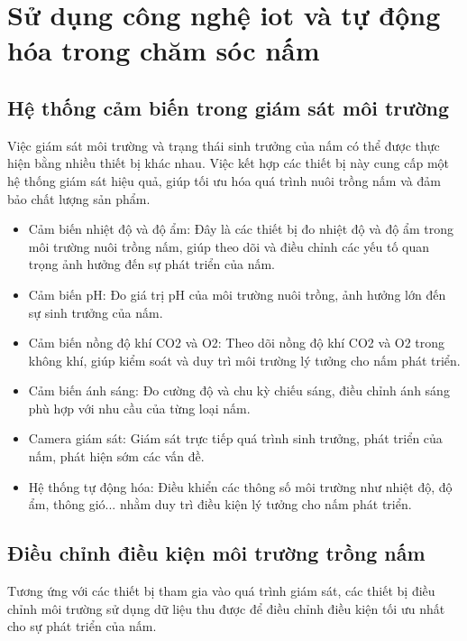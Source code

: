 \section{Sử dụng công nghệ \acrshort{iot} và tự động hóa trong chăm sóc nấm}

\subsection{Hệ thống cảm biến trong giám sát môi trường}

Việc giám sát môi trường và trạng thái sinh trưởng của nấm có thể được thực hiện bằng nhiều thiết bị khác nhau. Việc kết hợp các thiết bị này cung cấp một hệ thống giám sát hiệu quả, giúp tối ưu hóa quá trình nuôi trồng nấm và đảm bảo chất lượng sản phẩm.

\begin{itemize}
	\item Cảm biến nhiệt độ và độ ẩm: Đây là các thiết bị đo nhiệt độ và độ ẩm trong môi trường nuôi trồng nấm, giúp theo dõi và điều chỉnh các yếu tố quan trọng ảnh hưởng đến sự phát triển của nấm.

	\item Cảm biến pH: Đo giá trị pH của môi trường nuôi trồng, ảnh hưởng lớn đến sự sinh trưởng của nấm.

	\item Cảm biến nồng độ khí CO2 và O2: Theo dõi nồng độ khí CO2 và O2 trong không khí, giúp kiểm soát và duy trì môi trường lý tưởng cho nấm phát triển.

	\item Cảm biến ánh sáng: Đo cường độ và chu kỳ chiếu sáng, điều chỉnh ánh sáng phù hợp với nhu cầu của từng loại nấm.

	\item Camera giám sát: Giám sát trực tiếp quá trình sinh trưởng, phát triển của nấm, phát hiện sớm các vấn đề.

	\item Hệ thống tự động hóa: Điều khiển các thông số môi trường như nhiệt độ, độ ẩm, thông gió... nhằm duy trì điều kiện lý tưởng cho nấm phát triển.


\end{itemize}

\subsection{Điều chỉnh điều kiện môi trường trồng nấm}

Tương ứng với các thiết bị tham gia vào quá trình giám sát, các thiết bị điều chỉnh môi trường sử dụng dữ liệu thu được để điều chỉnh điều kiện tối ưu nhất cho sự phát triển của nấm.

